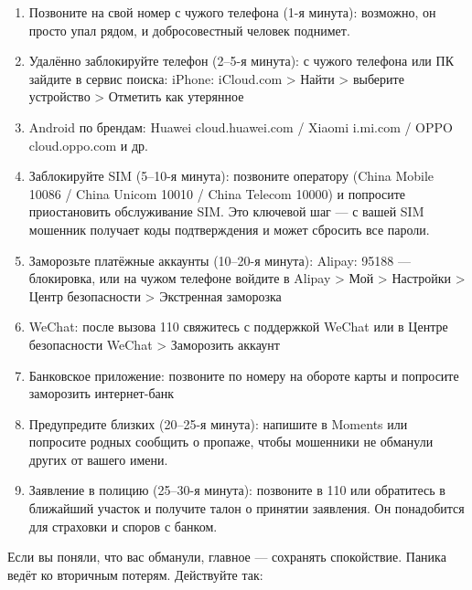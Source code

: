 \begin{enumerate}
  \item Позвоните на свой номер с чужого телефона (1-я минута): возможно, он просто упал рядом, и добросовестный человек поднимет.
  \item Удалённо заблокируйте телефон (2–5-я минута): с чужого телефона или ПК зайдите в сервис поиска: iPhone: iCloud.com > Найти > выберите устройство > Отметить как утерянное
  \item Android по брендам: Huawei cloud.huawei.com / Xiaomi i.mi.com / OPPO cloud.oppo.com и др.
  \item Заблокируйте SIM (5–10-я минута): позвоните оператору (China Mobile 10086 / China Unicom 10010 / China Telecom 10000) и попросите приостановить обслуживание SIM. Это ключевой шаг — с вашей SIM мошенник получает коды подтверждения и может сбросить все пароли.
  \item Заморозьте платёжные аккаунты (10–20-я минута): Alipay: 95188 — блокировка, или на чужом телефоне войдите в Alipay > Мой > Настройки > Центр безопасности > Экстренная заморозка
  \item WeChat: после вызова 110 свяжитесь с поддержкой WeChat или в Центре безопасности WeChat > Заморозить аккаунт
  \item Банковское приложение: позвоните по номеру на обороте карты и попросите заморозить интернет-банк
  \item Предупредите близких (20–25-я минута): напишите в Moments или попросите родных сообщить о пропаже, чтобы мошенники не обманули других от вашего имени.
  \item Заявление в полицию (25–30-я минута): позвоните в 110 или обратитесь в ближайший участок и получите талон о принятии заявления. Он понадобится для страховки и споров с банком.
\end{enumerate}


Если вы поняли, что вас обманули, главное — сохранять спокойствие. Паника ведёт ко вторичным потерям. Действуйте так:

